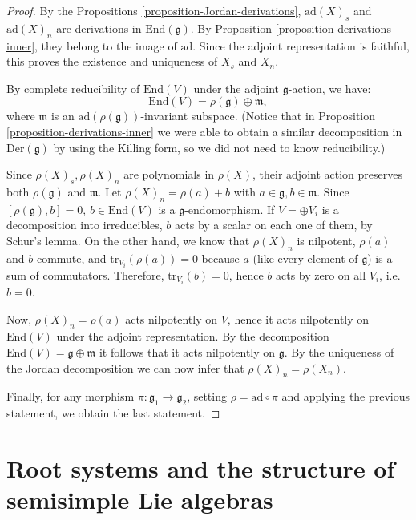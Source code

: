 \begin{proof}
By the Propositions \ref{proposition-Jordan-derivations}, $\text{ad}(X)_s$ and $\text{ad}(X)_n$ are derivations in $\text{End}(\mathfrak g)$. By Proposition \ref{proposition-derivations-inner}, they belong to the image of $\text{ad}$. Since the adjoint representation is faithful, this proves the existence and uniqueness of $X_s$ and $X_n$. 

By complete reducibility of $\text{End}(V)$ under the adjoint $\mathfrak g$-action, we have:
$$\text{End}(V)= \rho(\mathfrak g)\oplus\mathfrak m,$$
where $\mathfrak m$ is an $\text{ad}(\rho(\mathfrak g))$-invariant subspace. (Notice that in Proposition \ref{proposition-derivations-inner} we were able to obtain a similar decomposition in $\text{Der}(\mathfrak g)$ by using the Killing form, so we did not need to know reducibility.)

Since $\rho(X)_s,\rho(X)_n$ are polynomials in $\rho(X)$, their adjoint action preserves both $\rho(\mathfrak g)$ and $\mathfrak m$. Let $\rho(X)_n = \rho(a) + b$ with $a\in \mathfrak g,b\in \mathfrak m$. Since $[\rho(\mathfrak g),b]=0$,  $b\in \text{End}(V)$ is a $\mathfrak g$-endomorphism. If $V=\oplus V_i$ is a decomposition into irreducibles, $b$ acts by a scalar on each one of them, by Schur's lemma. On the other hand, we know that $\rho(X)_n$ is nilpotent, $\rho(a)$ and $b$ commute, and $\text{tr}_{V_i}(\rho(a)) =0$ because $a$ (like every element of $\mathfrak g$) is a sum of commutators. Therefore, $\text{tr}_{V_i}(b)=0$, hence $b$ acts by zero on all $V_i$, i.e.\ $b=0$. 

Now, $\rho(X)_n=\rho(a)$ acts nilpotently on $V$, hence it acts nilpotently on $\text{End}(V)$ under the adjoint representation. By the decomposition $\text{End}(V)=\mathfrak g\oplus \mathfrak m$ it follows that it acts nilpotently on $\mathfrak g$. By the uniqueness of the Jordan decomposition we can now infer that $\rho(X)_n= \rho(X_n)$. 

Finally, for any morphism $\pi: \mathfrak g_1 \to \mathfrak g_2$, setting $\rho=\text{ad}\circ\pi$ and applying the previous statement, we obtain the last statement.
\end{proof}



\section{Root systems and the structure of semisimple Lie algebras}
\label{section-root-decomposition}

